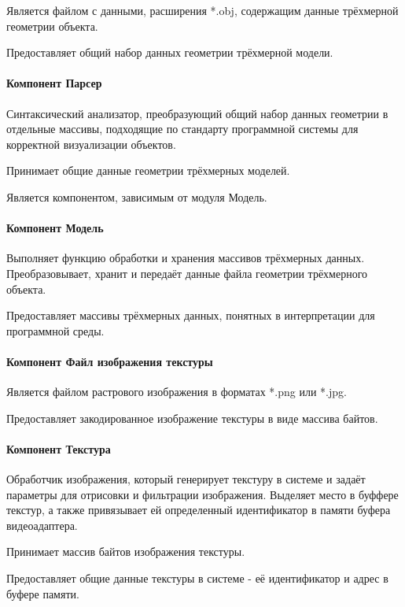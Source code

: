 Является файлом с данными, расширения *.obj, содержащим данные трёхмерной геометрии объекта.

Предоставляет общий набор данных геометрии трёхмерной модели.

\paragraph{Компонент Парсер}

Синтаксический анализатор, преобразующий общий набор данных геометрии в отдельные массивы, подходящие по стандарту программной системы для корректной визуализации объектов.

Принимает общие данные геометрии трёхмерных моделей.

Является компонентом, зависимым от модуля Модель.

\paragraph{Компонент Модель}

Выполняет функцию обработки и хранения массивов трёхмерных данных. Преобразовывает, хранит и передаёт данные файла геометрии трёхмерного объекта.

Предоставляет массивы трёхмерных данных, понятных в интерпретации для программной среды.

\paragraph{Компонент Файл изображения текстуры}

Является файлом растрового изображения в форматах *.png или *.jpg.

Предоставляет закодированное изображение текстуры в виде массива байтов.

\paragraph{Компонент Текстура}

Обработчик изображения, который генерирует текстуру в системе и задаёт параметры для отрисовки и фильтрации изображения. Выделяет место в буффере текстур, а также привязывает ей определенный идентификатор в памяти буфера видеоадаптера.

Принимает массив байтов изображения текстуры.

Предоставляет общие данные текстуры в системе - её идентификатор и адрес в буфере памяти.

